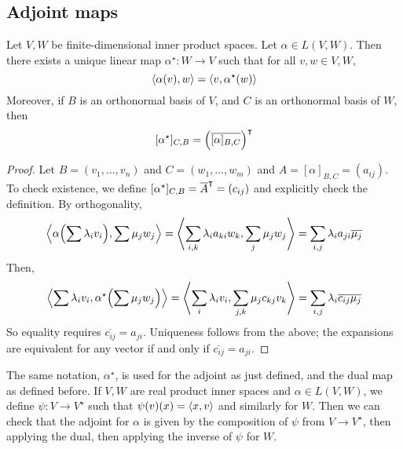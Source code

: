 \subsection{Adjoint maps}
\begin{definition}
	Let \( V, W \) be finite-dimensional inner product spaces.
	Let \( \alpha \in L(V, W) \).
	Then there exists a unique linear map \( \alpha^\star \colon W \to V \) such that for all \( v, w \in V, W \),
	\[
		\left\langle{\alpha(v), w}\right\rangle = \left\langle{v, \alpha^\star(w)}\right\rangle
	\]
	Moreover, if \( B \) is an orthonormal basis of \( V \), and \( C \) is an orthonormal basis of \( W \), then
	\[
		[\alpha^\star]_{C, B} = \qty(\overline{[\alpha]_{B, C}})^\intercal
	\]
\end{definition}
\begin{proof}
	Let \( B = (v_1, \dots, v_n) \) and \( C = (w_1, \dots, w_m) \) and \( A = [\alpha]_{B, C} = (a_{ij}) \).
	To check existence, we define \( [\alpha^\star]_{C, B} = \overline{A}^\intercal = (c_{ij}) \) and explicitly check the definition.
	By orthogonality,
	\[
		\left\langle{\alpha\qty(\sum \lambda_i v_i), \sum \mu_j w_j}\right\rangle = \left\langle{\sum_{i,k} \lambda_i a_{ki} w_k, \sum_j \mu_j w_j}\right\rangle = \sum_{i,j} \lambda_i a_{ji} \overline{\mu_j}
	\]
	Then,
	\[
		\left\langle{\sum \lambda_i v_i, \alpha^\star\qty(\sum \mu_j w_j)}\right\rangle = \left\langle{\sum_i \lambda_i v_i, \sum_{j,k} \mu_j c_{kj} v_k}\right\rangle = \sum_{i,j} \lambda_i \overline{c_{ij}} \overline{\mu_j}
	\]
	So equality requires \( \overline{c_{ij}} = a_{ji} \).
	Uniqueness follows from the above; the expansions are equivalent for any vector if and only if \( \overline{c_{ij}} = a_{ji} \).
\end{proof}
\begin{remark}
	The same notation, \( \alpha^\star \), is used for the adjoint as just defined, and the dual map as defined before.
	If \( V, W \) are real product inner spaces and \( \alpha \in L(V,W) \), we define \( \psi \colon V \to V^\star \) such that \( \psi(v)(x) = \left\langle{x,v}\right\rangle \) and similarly for \( W \).
	Then we can check that the adjoint for \( \alpha \) is given by the composition of \( \psi \) from \( V \to V^\star \), then applying the dual, then applying the inverse of \( \psi \) for \( W \).
\end{remark}

